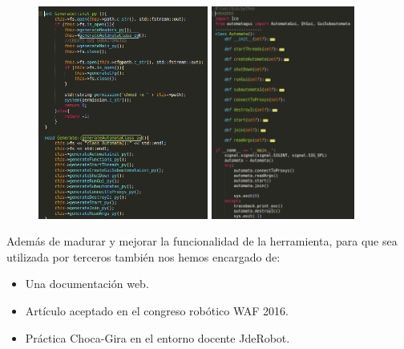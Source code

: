 \documentclass[notes,slidesec,a4]{seminar}
\begin{document}
\begin{hslide}

\begin{center}
	\begin{figure}
		\includegraphics[height=7cm]{imgs/templategenerator.png}
		\includegraphics[height=7cm]{imgs/templatecode.png}
	\end{figure}
\end{center}
\end{hslide}


\begin{hslide}

Además de madurar y mejorar la funcionalidad de la herramienta, para que sea utilizada por terceros también nos hemos encargado de:
\begin{itemize}
\item Una documentación web. 
\item Artículo aceptado en el congreso robótico WAF 2016.
\item Práctica Choca-Gira en el entorno docente JdeRobot.
\end{itemize}

\end{hslide}
\end{document}
